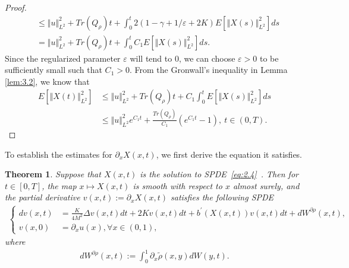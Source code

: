 \documentclass[11pt]{article}
\numberwithin{equation}{section}%
\numberwithin{figure}{section}%
\newtheorem{theorem}{Theorem}[section]
\theoremstyle{remark}
\begin{document}
\begin{proof}
\begin{align*}
			&\leq \Vert u\Vert _{L^{2}}^{2}+Tr(Q_{\rho})t+\int_{0}^{t}2(1-\gamma  + 1/\varepsilon+2K)E[\Vert X(s)\Vert _{L^{2}}^{2}]ds\\
			&=\Vert u\Vert _{L^{2}}^{2}+Tr(Q_{\rho})t+\int_{0}^{t}C_{1}E[\Vert X(s)\Vert _{L^{2}}^{2}]ds.
		\end{align*}
		Since the regularized parameter $\varepsilon$ will tend to 0, we can choose $\varepsilon>0$
		to be sufficiently small such that $C_{1}>0$. From the Gronwall's inequality in Lemma \ref{lem:3.2}, we know that
		\begin{align*}
			E[\Vert X(t)\Vert _{L^{2}}^{2}]
			&\leq \Vert u\Vert _{L^{2}}^{2}+Tr(Q_{\rho})t+C_{1}\int_{0}^{t}E[\Vert X(s)\Vert _{L^{2}}^{2}]ds\\
			&\leq \Vert u\Vert _{L^{2}}^{2}e^{C_{1}t}+\frac{Tr(Q_{\rho})}{C_{1}}(e^{C_{1}t}-1), \ t\in(0,T).
		\end{align*}

	\end{proof}
	To establish the estimates for $\partial_{x}X(x,t)$, we first derive the equation it satisfies.
		\begin{theorem}\label{thm:61}
		Suppose that $X(x,t)$ is the solution to SPDE~\eqref{eq:2.4}~. Then for $t\in[0,T]$, the map $x\longmapsto X(x,t)$ is smooth with respect to $x$ almost surely, and the partial derivative  $v(x,t):=\partial_{x}X(x,t)$ satisfies the following SPDE	\begin{align}\label{eq:6.2}
			\left\{
			\begin{aligned}
				dv(x,t)&=\frac{K}{4M^{2}}\Delta  v(x,t)dt+ 2K v(x,t)dt+b^{\prime}(X(x,t))v(x,t)dt+dW^{\partial\rho}(x,t),\\
				v(x,0)&=\partial_{x}u(x),\forall{x\in (0,1)},
			\end{aligned}
			\right.
		\end{align}
		where
		\begin{align*}
			dW^{\partial\rho}(x,t):=\int_{0}^{1} \partial_{x}\tilde{\rho}(x,y)dW(y,t). 
		\end{align*}
		
		
	\end{theorem}
\end{document}
